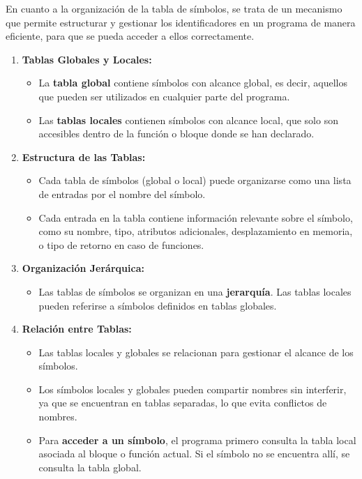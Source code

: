 En cuanto a la organización de la tabla de símbolos, se trata de un mecanismo que permite estructurar y gestionar los identificadores en un programa de manera eficiente, para que se pueda acceder a ellos correctamente.

\begin{enumerate}
    \item \textbf{Tablas Globales y Locales:}
    \begin{itemize}
        \item La \textbf{tabla global} contiene símbolos con alcance global, es decir, aquellos que pueden ser utilizados en cualquier parte del programa.
        \item Las \textbf{tablas locales} contienen símbolos con alcance local, que solo son accesibles dentro de la función o bloque donde se han declarado.
    \end{itemize}

    \item \textbf{Estructura de las Tablas:}
    \begin{itemize}
        \item Cada tabla de símbolos (global o local) puede organizarse como una lista de entradas por el nombre del símbolo.
        \item Cada entrada en la tabla contiene información relevante sobre el símbolo, como su nombre, tipo, atributos adicionales, desplazamiento en memoria, o tipo de retorno en caso de funciones.
    \end{itemize}

    \item \textbf{Organización Jerárquica:}
    \begin{itemize}
        \item Las tablas de símbolos se organizan en una \textbf{jerarquía}. Las tablas locales pueden referirse a símbolos definidos en tablas globales.
    \end{itemize}

    \item \textbf{Relación entre Tablas:}
    \begin{itemize}
        \item Las tablas locales y globales se relacionan para gestionar el alcance de los símbolos.
        \item Los símbolos locales y globales pueden compartir nombres sin interferir, ya que se encuentran en tablas separadas, lo que evita conflictos de nombres.
        \item Para \textbf{acceder a un símbolo}, el programa primero consulta la tabla local asociada al bloque o función actual. Si el símbolo no se encuentra allí, se consulta la tabla global.
    \end{itemize}

\end{enumerate}